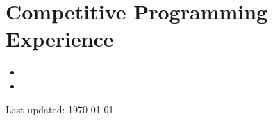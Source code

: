 \documentclass{article}
\begin{document}
	\section{Competitive Programming Experience}
	\begin{itemize}
		\item{}
		\item{}
	\end{itemize}
	Last updated: \today.
\end{document}
